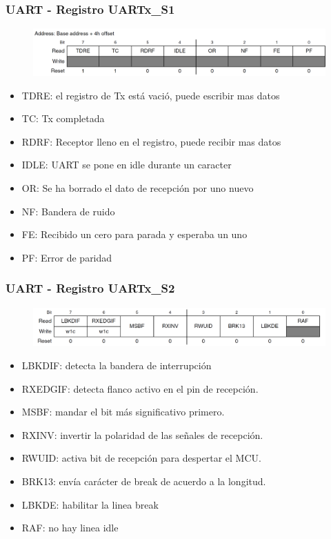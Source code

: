 \documentclass[10.5pt,scale=1.0,t,aspectratio=169,hyperref={pdfpagelabels=false}]{beamer}
\begin{document}
\begin{frame}
	\frametitle{UART - Registro UARTx\_S1}
	{\small
		\begin{figure}
			\centering
			\includegraphics[scale=0.3]{42_UARTS1}
		\end{figure}
		
		\begin{itemize}
			\item TDRE: el registro de Tx está vació, puede escribir mas datos
			\item TC: Tx completada
			\item RDRF: Receptor lleno en el registro, puede recibir mas datos
			\item IDLE: UART se pone en idle durante un caracter
			\item OR: Se ha borrado el dato de recepción por uno nuevo
			\item NF: Bandera de ruido
			\item FE: Recibido un cero para parada y esperaba un uno
			\item PF: Error de paridad
		\end{itemize}
	}
\end{frame}
\begin{frame}
	\frametitle{UART - Registro UARTx\_S2}
	{\small
		\begin{figure}
			\centering
			\includegraphics[scale=0.3]{43_UARTS2}
		\end{figure}
		
		\begin{itemize}
			\item LBKDIF: detecta la bandera de interrupción
			\item RXEDGIF: detecta flanco activo en el pin de recepción.
			\item MSBF: mandar el bit más significativo primero.
			\item RXINV: invertir la polaridad de las señales de recepción. 
			\item RWUID: activa bit de recepción para despertar el MCU.
			\item BRK13: envía carácter de break de acuerdo a la longitud.
			\item LBKDE: habilitar la linea break
			\item RAF: no hay linea idle
		\end{itemize}
	}
\end{frame}
\end{document}
